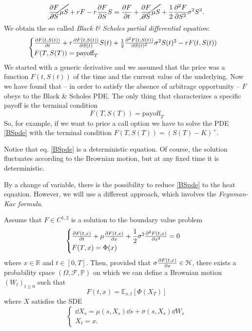 \begin{equation*}
    \cancel{\pdv{F}{S}\mu S} + rF - r\pdv{F}{S} S = \pdv{F}{t} + \cancel{\pdv{F}{S}\mu S} + \dfrac{1}{2}\pdv[2]{F}{S}\sigma^2S^2.
\end{equation*}
We obtain the so called \emph{Black \& Scholes partial differential equation}:
\begin{equation}\label{BSpde}
    \begin{cases}
    \pdv{F(t,S(t))}{t} + r\pdv{F(t,S(t))}{S(t)} S(t) + \frac{1}{2}\pdv[2]{F(t,S(t))}{S(t)}\sigma^2S(t)^2 - rF(t,S(t))\\
    F(T,S(T)) = \mbox{payoff}_T
    \end{cases}
\end{equation}
We started with a generic derivative and we assumed that the price was a function $F(t,S(t))$ of the time and the current value of the underlying. Now we have found that -- in order to satisfy the absence of arbitrage opportunity -- $F$ obeys to the Black \& Scholes PDE. The only thing that characterizes a specific payoff is the terminal condition
\begin{equation}
    F(T,S(T)) = \mbox{payoff}_T
\end{equation}
So, for example, if we want to price a call option we have to solve the PDE \eqref{BSpde} with the terminal condition $F(T,S(T))=(S(T)-K)^+$.
\begin{remark}
    Notice that eq. \eqref{BSpde} is a deterministic equation. Of course, the solution fluctuates according to the Brownian motion, but at any fixed time it is deterministic.
\end{remark}
By a change of variable, there is the possibility to reduce \eqref{BSpde} to the heat equation. However, we will use a different approach, which involves the \emph{Feynman-Kac formula}.
\begin{theorem}
    Assume that $F\in C^{1,2}$ is a solution to the boundary value problem
    \begin{equation}\label{bvp}
        \begin{cases}
        \pdv{F(t,x)}{t} + \mu\pdv{F(t,x)}{x} + \dfrac{1}{2}\sigma^2\pdv[2]{F(t,x)}{x}=0\\
        F(T,x) = \Phi(x)
        \end{cases}
    \end{equation}
    where $x\in\mathbb{R}$ and $t\in[0,T]$. Then, provided that $\sigma\pdv{F(t,x)}{x}\in\mathcal{H}$, there exists a probability space $(\Omega,\mathcal{F},\mathbb{P})$ on which we can define a Brownian motion $(W_t)_{t\ge0}$ such that
    \begin{equation}
        F(t,x) = \mathbb{E}_{x,t}[\Phi(X_T)]
    \end{equation}
    where $X$ satisfies the SDE
    \begin{equation}\label{fk}
        \begin{cases}
        \dd X_s = \mu(s, X_s)\dd s + \sigma(s, X_s)\dd W_s\\
        X_t = x.
        \end{cases}
    \end{equation}
\end{theorem}
